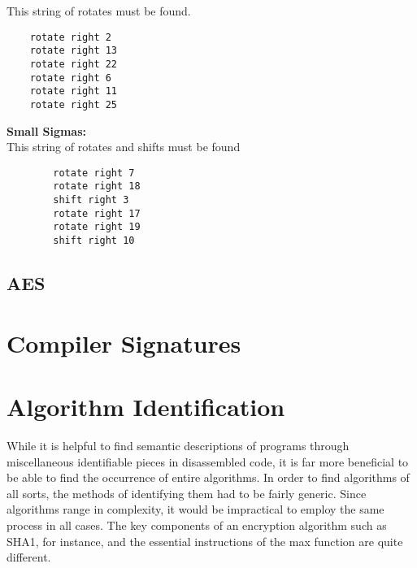 \documentclass{article}
\begin{document}
    This string of rotates must be found.\\

\begin{algorithm}
\lstset{language=[mips]Assembler}
\begin{lstlisting}    
    rotate right 2
    rotate right 13
    rotate right 22
    rotate right 6
    rotate right 11
    rotate right 25
\end{lstlisting}
\end{algorithm}

    \textbf{Small Sigmas:} \\

    This string of rotates and shifts must be found \\

\begin{algorithm}
\lstset{language=[mips]Assembler}
\begin{lstlisting}
        rotate right 7
        rotate right 18
        shift right 3
        rotate right 17
        rotate right 19
        shift right 10
\end{lstlisting}
\end{algorithm}

\subsection*{AES}

\pagebreak
\section*{Compiler Signatures}

\pagebreak

\section*{Algorithm Identification}
While it is helpful to find semantic descriptions of programs through miscellaneous identifiable pieces in disassembled code, it is far more 
beneficial to be able to find the occurrence of entire algorithms.  In order to find algorithms of all sorts, the methods of identifying
them had to be fairly generic.  Since algorithms range in complexity, it would be impractical to employ the same process in all cases.  The key
components of an encryption algorithm such as SHA1, for instance, and the essential instructions of the max function are quite different.  
\end{document}
